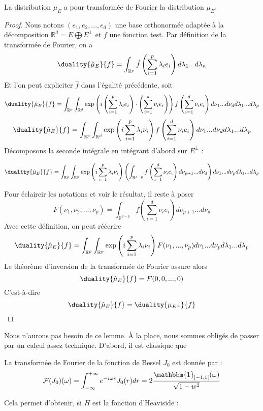 \documentclass[11pt,a4paper]{article}
\begin{document}
\begin{Lem} La distribution $\mu_E$ a pour transformée de Fourier la distribution $\mu_{E^{\perp}}$ 
\begin{proof}
Nous notons $(e_1,e_2,...,e_d)$ une base orthonormée adaptée à la décomposition $\mathbb{R}^d = E\bigoplus E^{\perp}$ et $f$ une fonction test. Par définition de la transformée de Fourier, on a 
\[\duality{\hat{\mu}_E}{f} = \int_{\mathbb{R}^p} \hat{f}\left(\sum_{i=1}^p \lambda_i e_i\right)d\lambda_1...d\lambda_n\]
Et l'on peut expliciter $\hat{f}$ dans l'égalité précédente, soit
\[ \duality{\hat{\mu}_E}{f} = \int_{\mathbb{R}^p} \int_{\mathbb{R}^d}\exp\left(i\left(\sum_{i=1}^p\lambda_i e_i\right)\cdot \left(\sum_{i=1}^d\nu_i e_i\right)\right)f\left(\sum_{i=1}^d\nu_i e_i\right)d\nu_1...d\nu_d d\lambda_1 ...d\lambda_p\]
\[\duality{\hat{\mu}_E}{f} = \int_{\mathbb{R}^p} \int_{\mathbb{R}^d}\exp\left(i\sum_{i=1}^p\lambda_i \nu_i\right)f\left(\sum_{i=1}^d\nu_i e_i\right)d\nu_1...d\nu_d d\lambda_1 ...d\lambda_p\]
Décomposons la seconde intégrale en intégrant d'abord sur $E^{\perp}$ :

\[\duality{\hat{\mu}_E}{f} = \int_{\mathbb{R}^p} \int_{\mathbb{R}^p}\exp\left(i\sum_{i=1}^p\lambda_i \nu_i \right)\left(\int_{\mathbb{R}^{d-p}}f\left(\sum_{i=1}^d\nu_i e_i\right)d\nu_{p+1}...d\nu_d \right)d\nu_1... d\nu_p d\lambda_1 ...d\lambda_p\]

Pour éclaircir les notations et voir le résultat, il reste à poser 
\[F(\nu_1,\nu_2,...,\nu_p) = \int_{\mathbb{R}^{d-p}}f\left(\sum_{i=1}^d\nu_i e_i\right)d\nu_{p+1}...d\nu_d \]
Avec cette définition, on peut réécrire 
\[\duality{\hat{\mu}_E}{f} = \int_{\mathbb{R}^p} \int_{\mathbb{R}^p}\exp\left(i\sum_{i=1}^p\lambda_i \nu_i \right)F(\nu_1,...,\nu_p)d\nu_1... d\nu_p d\lambda_1 ...d\lambda_p\]
Le théorème d'inversion de la transformée de Fourier assure alors 
\[\duality{\hat{\mu}_E}{f} = F(0,0,...,0)\]
C'est-à-dire  
\[\duality{\hat{\mu}_E}{f} = \duality{\mu_{E^\perp}}{f}\]
\end{proof}
\end{Lem}
Nous n'aurons pas besoin de ce lemme. 
À la place, nous sommes obligés de passer par un calcul assez technique. D'abord, il est classique que
\begin{Lem} La transformée de Fourier de la fonction de Bessel $J_0$ est donnée par : 
\[\mathcal{F}(J_0)(\omega) = \int_{-\infty}^{+\infty} e^{-i\omega r} J_0(r)dr = 2\dfrac{\mathbbm{1}_{]-1,1[}(\omega)}{\sqrt{1-w^2}}\]
\end{Lem}
Cela permet d'obtenir, si $H$ est la fonction d'Heaviside :  
\end{document}
